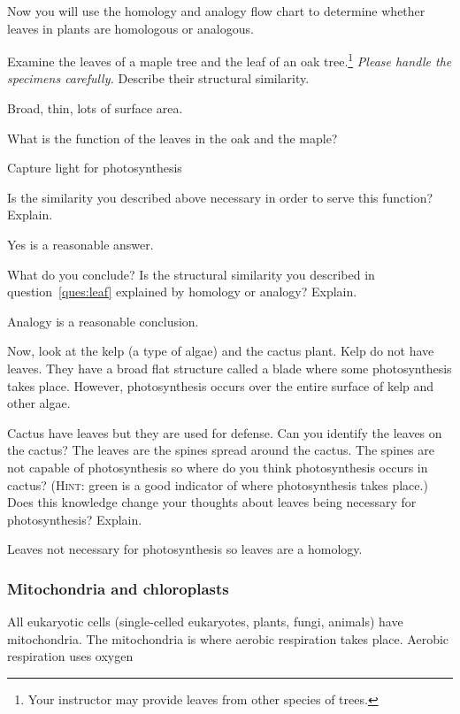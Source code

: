 \documentclass[12pt, hidelinks]{exam}
\newcommand*\AnswerBox[2]{%
    \parbox[t][#1]{0.92\textwidth}{%
    \begin{solution}#2\end{solution}}
    \vspace{\stretch{1}}
}
\begin{document}
\begin{questions}
Now you will use the homology and analogy flow chart to determine whether leaves in plants are homologous or analogous.

\question\label{ques:leaf}
Examine the leaves of a maple tree and the leaf of
an oak tree.\footnote{Your instructor may provide leaves from other species of trees.} \emph{Please
handle the specimens carefully.} Describe their structural similarity.

\AnswerBox{3\baselineskip}{Broad, thin, lots of surface area.}

\question
What is the function of the leaves in the oak and the maple?

\AnswerBox{3\baselineskip}{Capture light for photosynthesis}

\question
Is the similarity you described above necessary in order to serve
this function? Explain. 

\AnswerBox{3\baselineskip}{Yes is a reasonable answer.}

\question
What do you conclude? Is the structural similarity you described in
question~\ref{ques:leaf} explained by homology or analogy? Explain.

\AnswerBox{3\baselineskip}{Analogy is a reasonable conclusion.}

\question
Now, look at the kelp (a type of algae) and the cactus plant. Kelp do 
not have leaves. They have a broad flat structure called a blade where
some photosynthesis takes place. However, photosynthesis occurs over
the entire surface of kelp and other algae.

Cactus have leaves but they are used for defense. Can you identify the leaves on the
cactus? The leaves are the spines spread around the cactus. The spines are not
capable of photosynthesis so where do you think photosynthesis occurs in cactus? 
(\textsc{Hint:} green is a good indicator of where photosynthesis takes place.)
Does this knowledge change your thoughts about leaves being necessary for
photosynthesis? Explain. %

\AnswerBox{5\baselineskip}{Leaves not necessary for photosynthesis so leaves are a homology.}

\subsubsection*{Mitochondria and chloroplasts}

All eukaryotic cells (single-celled eukaryotes, plants, fungi, animals) have mitochondria.  The mitochondria is where aerobic respiration takes place. Aerobic respiration uses oxygen 


\end{questions}
\end{document}
